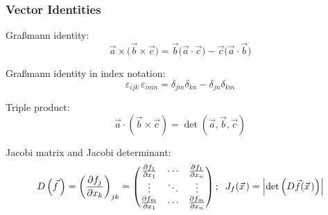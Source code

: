 		\subsubsection{Vector Identities}
			\noindent
			Graßmann identity:
			\begin{equation}
				\vec{a}\times\big(\vec{b}\times\vec{c}\big) = \vec{b}\big(\vec{a}\cdot\vec{c}\big) - \vec{c}\big(\vec{a}\cdot\vec{b}\big)
			\end{equation}

			\noindent
			Graßmann identity in index notation:
			\begin{equation}
				\varepsilon_{ijk}\,\varepsilon_{imn}=\delta_{jm}\delta_{kn}-\delta_{jn}\delta_{km}
			\end{equation}

			\noindent
			Triple product:
			\begin{equation}
				\vec{a}\cdot\left(\vec{b}\times\vec{c}\right) = \det\left(\vec{a},\vec{b},\vec{c}\right)
			\end{equation}

			\noindent
			Jacobi matrix and Jacobi determinant:
			\begin{equation}
				D\left(\vec{f}\,\right) = \left(\frac{\partial f_j}{\partial x_k}\right)_{jk}
				= \left(\begin{matrix}
				\frac{\partial f_1}{\partial x_1} & \dotsb & \frac{\partial f_1}{\partial x_n} \\
				\vdots & \ddots & \vdots \\
				\frac{\partial f_m}{\partial x_1} & \dotsb & \frac{\partial f_m}{\partial x_n} \\
				\end{matrix}\right);\;\;J_f(\pvec{x})=\left|\det\left(D\vec{f}(\pvec{x})\right)\right|
			\end{equation}


